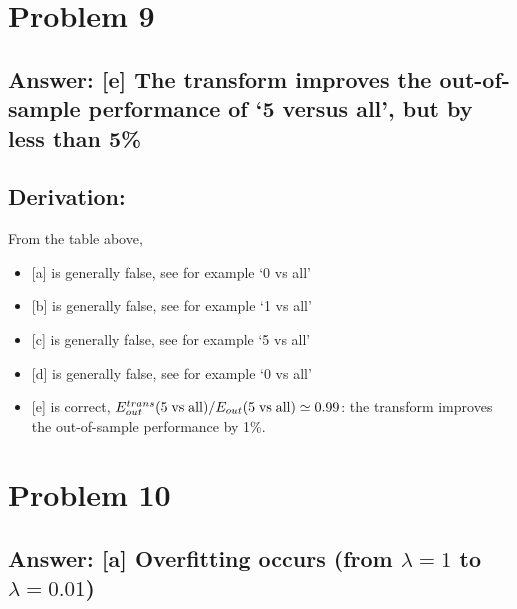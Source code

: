 \documentclass[11pt]{article}
\providecommand{\tightlist}{%
      \setlength{\itemsep}{0pt}\setlength{\parskip}{0pt}}
\begin{document}
    \hypertarget{problem-9}{%
\section{Problem 9}\label{problem-9}}

\hypertarget{answer-e-the-transform-improves-the-out-of-sample-performance-of-5-versus-all-but-by-less-than-5}{%
\subsection{Answer: {[}e{]} The transform improves the out-of-sample
performance of `5 versus all', but by less than
5\%}\label{answer-e-the-transform-improves-the-out-of-sample-performance-of-5-versus-all-but-by-less-than-5}}

\hypertarget{derivation}{%
\subsection{Derivation:}\label{derivation}}

From the table above,

\begin{itemize}
\tightlist
\item
  {[}a{]} is generally false, see for example `0 vs all'
\item
  {[}b{]} is generally false, see for example `1 vs all'
\item
  {[}c{]} is generally false, see for example `5 vs all'
\item
  {[}d{]} is generally false, see for example `0 vs all'
\item
  {[}e{]} is correct,
  \(E^{trans}_{out}({\rm 5\; vs\; all})/E_{out}({\rm 5\; vs\; all})\simeq 0.99\):
  the transform improves the out-of-sample performance by 1\%.
\end{itemize}

    \hypertarget{problem-10}{%
\section{Problem 10}\label{problem-10}}

\hypertarget{answer-a-overfitting-occurs-from-lambda1-to-lambda0.01}{%
\subsection{\texorpdfstring{Answer: {[}a{]} Overfitting occurs (from
\(\lambda=1\) to
\(\lambda=0.01\))}{Answer: {[}a{]} Overfitting occurs (from \textbackslash{}lambda=1 to \textbackslash{}lambda=0.01)}}\label{answer-a-overfitting-occurs-from-lambda1-to-lambda0.01}}
\end{document}
